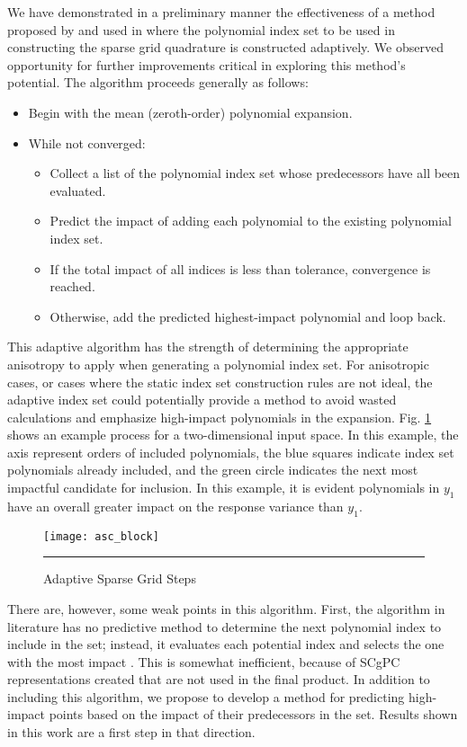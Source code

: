 We have demonstrated in a preliminary manner the effectiveness of a method proposed by \cite{Gerstner} and used in
\cite{Ayres} where the polynomial index set to be
used in constructing the sparse grid quadrature is constructed adaptively.
We observed opportunity for further improvements critical
in exploring this method's potential.  The algorithm proceeds generally
as follows:
\begin{itemize}
  \item Begin with the mean (zeroth-order) polynomial expansion.
  \item While not converged:
    \begin{itemize}
      \item Collect a list of the polynomial index set whose predecessors have all been evaluated.
      \item Predict the impact of adding each polynomial to the existing polynomial index set.
      \item If the total impact of all indices is less than tolerance, convergence is reached.
      \item Otherwise, add the predicted highest-impact polynomial and loop back.
    \end{itemize}
\end{itemize}
This adaptive algorithm has the strength of determining the appropriate anisotropy to apply when generating a
polynomial index set.  For anisotropic cases, or cases where the static index set construction rules are not
ideal, the adaptive index set could potentially provide a method to avoid wasted calculations and emphasize
high-impact polynomials in the expansion.  Fig. \ref{fig:asg_step} shows an example process for a
two-dimensional input space. In this example, the axis represent orders of included polynomials, the blue
squares indicate index set polynomials already included, and the green circle indicates the next most
impactful candidate for inclusion.  In this example, it is evident polynomials in $y_1$ have an overall
greater impact on the response variance than $y_1$.

\begin{figure}[H]
  \centering
  \texttt{[image: asc\_block]}
  \rule{35em}{0.5pt}
  \caption{Adaptive Sparse Grid Steps}
  \label{fig:asg_step}
\end{figure}

There are, however, some weak points in this algorithm.  First, the algorithm in literature has no predictive method
to determine the next polynomial index to include in the set; instead, it evaluates each potential index and
selects the one with the most impact \cite{Ayres}.  This is somewhat inefficient, because of SCgPC representations created
that are not used in the final product.  In addition to including this algorithm, we propose to develop a
method for predicting high-impact points based on the impact of their predecessors in the set.  Results shown
in this work are a first step in that direction.

